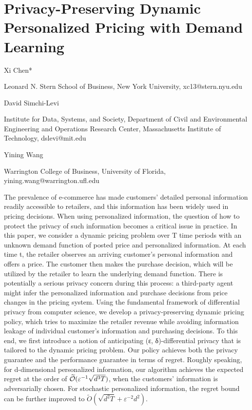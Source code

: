 


\section{Privacy-Preserving Dynamic Personalized Pricing with Demand Learning}\label{privacy-preserving-dynamic-personalized-pricing-with-demand-learning}

Xi Chen*

Leonard N. Stern School of Business, New York University, xc13@stern.nyu.edu

David Simchi-Levi

Institute for Data, Systems, and Society, Department of Civil and Environmental Engineering and Operations Research Center, Massachusetts Institute of Technology, dslevi@mit.edu

Yining Wang

Warrington College of Business, University of Florida, yining.wang@warrington.ufl.edu

The prevalence of e-commerce has made customers' detailed personal information readily accessible to retailers, and this information has been widely used in pricing decisions. When using personalized information, the question of how to protect the privacy of such information becomes a critical issue in practice. In this paper, we consider a dynamic pricing problem over T time periods with an unknown demand function of posted price and personalized information. At each time t, the retailer observes an arriving customer's personal information and offers a price. The customer then makes the purchase decision, which will be utilized by the retailer to learn the underlying demand function. There is potentially a serious privacy concern during this process: a third-party agent might infer the personalized information and purchase decisions from price changes in the pricing system. Using the fundamental framework of differential privacy from computer science, we develop a privacy-preserving dynamic pricing policy, which tries to maximize the retailer revenue while avoiding information leakage of individual customer's information and purchasing decisions. To this end, we first introduce a notion of anticipating (ε, δ)-differential privacy that is tailored to the dynamic pricing problem. Our policy achieves both the privacy guarantee and the performance guarantee in terms of regret. Roughly speaking, for d-dimensional personalized information, our algorithm achieves the expected regret at the order of \(\widetilde { \cal O } ( \varepsilon ^ { - 1 } \sqrt { d ^ { 3 } T } )\), when the customers' information is adversarially chosen. For stochastic personalized information, the regret bound can be further improved to \(\widetilde { O } ( \sqrt { d ^ { 2 } T } + \varepsilon ^ { - 2 } d ^ { 2 } )\).

